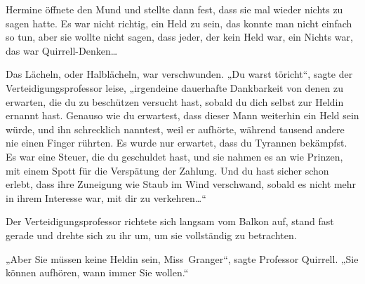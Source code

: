 Hermine öffnete den Mund und stellte dann fest, dass sie mal wieder nichts zu sagen hatte. Es war nicht richtig, ein Held zu sein, das konnte man nicht einfach so tun, aber sie wollte nicht sagen, dass jeder, der kein Held war, ein Nichts war, das war Quirrell-Denken…

Das Lächeln, oder Halblächeln, war verschwunden. „Du warst töricht“, sagte der Verteidigungsprofessor leise, „irgendeine dauerhafte Dankbarkeit von denen zu erwarten, die du zu beschützen versucht hast, sobald du dich selbst zur Heldin ernannt hast. Genauso wie du erwartest, dass dieser Mann weiterhin ein Held sein würde, und ihn schrecklich nanntest, weil er aufhörte, während tausend andere nie einen Finger rührten. Es wurde nur erwartet, dass du Tyrannen bekämpfst. Es war eine Steuer, die du geschuldet hast, und sie nahmen es an wie Prinzen, mit einem Spott für die Verspätung der Zahlung. Und du hast sicher schon erlebt, dass ihre Zuneigung wie Staub im Wind verschwand, sobald es nicht mehr in ihrem Interesse war, mit dir zu verkehren…“

Der Verteidigungsprofessor richtete sich langsam vom Balkon auf, stand fast gerade und drehte sich zu ihr um, um sie vollständig zu betrachten.

„Aber Sie müssen keine Heldin sein, Miss~Granger“, sagte Professor Quirrell. „Sie können aufhören, wann immer Sie wollen.“

